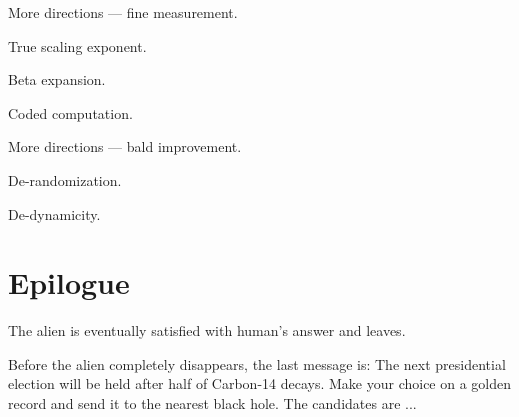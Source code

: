 \documentclass[12pt, aspectratio=1610]{beamer}
\begin{document}
\begin{frame}
	More directions --- fine measurement.

	True scaling exponent.

	Beta expansion.
	
	Coded computation.
\end{frame}

\begin{frame}
	More directions --- bald improvement.

	De-randomization.

	De-dynamicity.
\end{frame}

\part{Epilogue}

\begin{frame}
	\centering
	\color{structure.fg}
	\insertpart
\end{frame}

\begin{frame}
	The alien is eventually satisfied with human's answer and leaves.

	Before the alien completely disappears, the last message is:
	The next presidential election will be held after half of Carbon-14 decays.
	Make your choice on a golden record and send it to the nearest black hole.
	The candidates are ...

\end{frame}


\begin{frame}
\end{frame}
\end{document}
